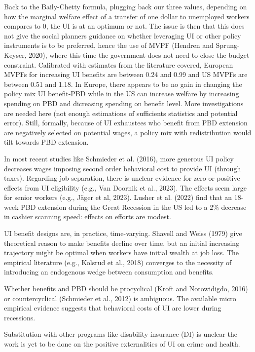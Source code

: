 \documentclass{article}
\begin{document}
Back to the Baily-Chetty formula, plugging back our three values, depending on how the marginal welfare effect of a transfer of one dollar to unemployed workers compares to 0, the UI is at an optimum or not. The issue is then that this does not give the social planners guidance on whether leveraging UI or other policy instruments is to be preferred, hence the use of MVPF (Hendren and Sprung-Keyser, 2020), where this time the government does not need to close the budget constraint. Calibrated with estimates from the literature covered, European MVPFs for increasing UI benefits are between 0.24 and 0.99 and US MVPFs are between 0.51 and 1.18. In Europe, there appears to be no gain in changing the policy mix UI benefit-PBD while in the US can increase welfare by increasing spending on PBD and dicreasing spending on benefit level. More investigations are needed here (not enough estimations of sufficients statistics and potential error). Still, formally, because of UI exhaustees who benefit from PBD extension are negatively selected on potential wages, a policy mix with redistribution would tilt towards PBD extension.

In most recent studies like Schmieder et al. (2016), more generous UI policy decreases wages imposing second order behavioral cost to provide UI (through taxes). Regarding job separation, there is unclear evidence for zero or positive effects from UI eligibility (e.g., Van Doornik et al., 2023). The effects seem large for senior workers (e.g., Jäger et al, 2023). Lusher et al. (2022) find that an 18-week PBD extension during the Great Recession in the US led to a 2\% decrease in cashier scanning speed: effects on efforts are modest.

UI benefit designs are, in practice, time-varying. Shavell and Weiss (1979) give theoretical reason to make benefits decline over time, but an initial increasing trajectory might be optimal when workers have initial wealth at job loss. The empirical literature (e.g., Kolsrud et al., 2018) converges to the necessity of introducing an endogenous wedge between consumption and benefits.

Whether benefits and PBD should be procyclical (Kroft and Notowidigdo, 2016) or countercyclical (Schmieder et al., 2012) is ambiguous. The available micro empirical evidence suggests that behavioral costs of UI are lower during recessions.

Substitution with other programs like disability insurance (DI) is unclear the work is yet to be done on the positive externalities of UI on crime and health.
\end{document}
